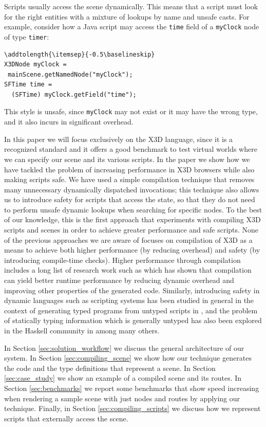 Scripts usually access the scene dynamically. This means that a script must look for the right entities with a mixture of lookups by name and unsafe casts. For example, consider how a Java script may access the \texttt{time} field of a \texttt{myClock} node of type \texttt{timer}:

\begin{lstlisting}
\addtolength{\itemsep}{-0.5\baselineskip}
X3DNode myClock = 
 mainScene.getNamedNode("myClock");
SFTime time = 
  (SFTime) myClock.getField("time");
\end{lstlisting}

This style is unsafe, since \texttt{myClock} may not exist or it may have the wrong type, and it also incurs in significant overhead.

In this paper we will focus exclusively on the X3D language, since it is a recognized standard and it offers a good benchmark to test virtual worlds where we can specify our scene and its various scripts. In the paper we show how we have tackled the problem of increasing performance in X3D browsers while also making scripts safe. We have used a simple compilation technique that removes many unnecessary dynamically dispatched invocations; this technique also allows us to introduce safety for scripts that access the state, so that they do not need to perform unsafe dynamic lookups when searching for specific nodes. To the best of our knowledge, this is the first approach that experiments with compiling X3D scripts and scenes in order to achieve greater performance and safe scripts. None of the previous approaches we are aware of focuses on compilation of X3D as a means to achieve both higher performance (by reducing overhead) and safety (by introducing compile-time checks). Higher performance through compilation includes a long list of research work such as \cite{OPT1,OPT2,OPT3} which has shown that compilation can yield better runtime performance by reducing dynamic overhead and improving other properties of the generated code. Similarly, introducing safety in dynamic languages such as scripting systems has been studied in general in the context of generating typed programs from untyped scripts in \cite{SAFESCRIPTS1}, and the problem of statically typing information which is generally untyped has also been explored in the Haskell community in \cite{SAFESCRIPTS2} among many others.

In Section \ref{sec:solution_workflow} we discuss the general architecture of our system. In Section \ref{sec:compiling_scene} we show how our technique generates the code and the type definitions that represent a scene. In Section \ref{sec:case_study} we show an example of a compiled scene and its routes. In Section \ref{sec:benchmarks} we report some benchmarks that show speed increasing when rendering a sample scene with just nodes and routes by applying our technique. Finally, in Section \ref{sec:compiling_scripts} we discuss how we represent scripts that externally access the scene.

